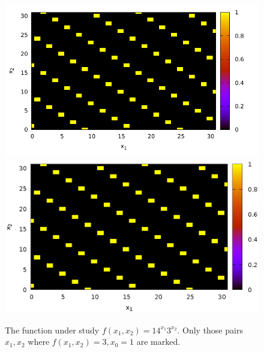 \begin{figure}
\centering
\ifpdf
\includegraphics[angle=0]
{./discretlog/picdiscretlog1.pdf}
\else
\includegraphics[angle=0]
{./discretlog/picdiscretlog1.eps}
\fi

%

\caption{The function under study $f(x_1, x_2) = 14^{x_1}3^{x_2}$. Only those pairs $x_1, x_2$ where $f(x_1, x_2) = 3, x_0 = 1$ are marked.} 
\label{fig:dl1}
\end{figure}
